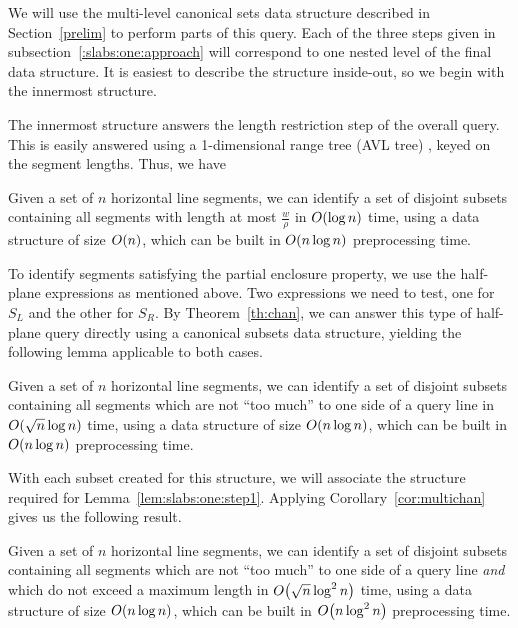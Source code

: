 We will use the multi-level canonical sets data structure described in 
Section~\ref{prelim} to perform parts of this query.
Each of the three steps given in subsection~\ref{:slabs:one:approach} will 
correspond to one nested level of the final data structure.
It is easiest to describe the structure inside-out, so we begin with the 
innermost structure.



The innermost structure answers the length restriction step of the overall 
query. 
This is easily answered using a 1-dimensional range tree (AVL tree) 
\cite{Deberg}, 
keyed on the segment lengths. Thus, we have

\begin{lemma}
\label{lem:slabs:one:step1}
Given a set of $n$ horizontal line segments, we can identify a set of disjoint 
subsets containing all segments with length at most $\frac{w}{\rho}$ in 
$O\!\left(\log{n}\right)$ time, using a data structure of size $O\!\left(n\right)$, which can be 
built in $O\!\left(n \log{n}\right)$ preprocessing time.
\end{lemma}



To identify segments satisfying the partial enclosure property, we use the 
half-plane expressions as mentioned above. 
Two expressions we need to test, one for $S_L$ and the other for $S_R$. 
By Theorem~\ref{th:chan}, we can answer this type of half-plane query directly 
using a canonical subsets data structure, yielding the following lemma 
applicable to both cases.

\begin{lemma}
\label{lem:slabs:one:step2a}
Given a set of $n$ horizontal line segments, we can identify a set of disjoint 
subsets containing all segments which are not ``too much'' to one side of a 
query line in $O\!\left(\sqrt{n}\log{n}\right)$ time, using a data structure of size 
$O\!\left(n\log{n}\right)$, which can be built in $O\!\left(n\log{n}\right)$ preprocessing time.
\end{lemma}

With each subset created for this structure, we will associate the structure 
required for Lemma~\ref{lem:slabs:one:step1}.
Applying Corollary~\ref{cor:multichan} gives us the following result.

\begin{lemma}
\label{lem:slabs:one:step2b}
Given a set of $n$ horizontal line segments, we can identify a set of disjoint 
subsets containing all segments which are not ``too much'' to one side of a 
query line \emph{and} which do not exceed a maximum length in 
$O\!\left(\sqrt{n}\log^2{n}\right)$ time, using a data structure of size 
$O\!\left(n\log{n}\right)$, which can be built in $O\!\left(n\log^2{n}\right)$ preprocessing 
time.
\end{lemma}


